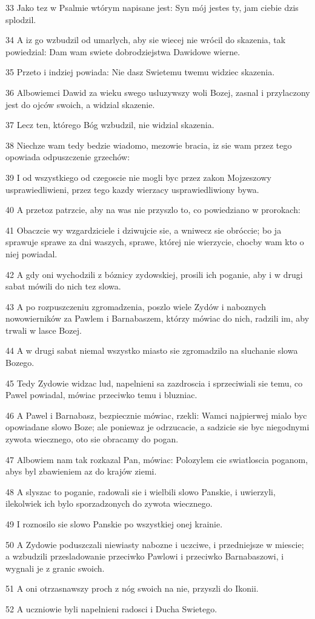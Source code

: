\par 33 Jako tez w Psalmie wtórym napisane jest: Syn mój jestes ty, jam ciebie dzis splodzil.
\par 34 A iz go wzbudzil od umarlych, aby sie wiecej nie wrócil do skazenia, tak powiedzial: Dam wam swiete dobrodziejstwa Dawidowe wierne.
\par 35 Przeto i indziej powiada: Nie dasz Swietemu twemu widziec skazenia.
\par 36 Albowiemci Dawid za wieku swego usluzywszy woli Bozej, zasnal i przylaczony jest do ojców swoich, a widzial skazenie.
\par 37 Lecz ten, którego Bóg wzbudzil, nie widzial skazenia.
\par 38 Niechze wam tedy bedzie wiadomo, mezowie bracia, iz sie wam przez tego opowiada odpuszczenie grzechów:
\par 39 I od wszystkiego od czegoscie nie mogli byc przez zakon Mojzeszowy usprawiedliwieni, przez tego kazdy wierzacy usprawiedliwiony bywa.
\par 40 A przetoz patrzcie, aby na was nie przyszlo to, co powiedziano w prorokach:
\par 41 Obaczcie wy wzgardziciele i dziwujcie sie, a wniwecz sie obróccie; bo ja sprawuje sprawe za dni waszych, sprawe, której nie wierzycie, chocby wam kto o niej powiadal.
\par 42 A gdy oni wychodzili z bóznicy zydowskiej, prosili ich poganie, aby i w drugi sabat mówili do nich tez slowa.
\par 43 A po rozpuszczeniu zgromadzenia, poszlo wiele Zydów i naboznych nowowierników za Pawlem i Barnabaszem, którzy mówiac do nich, radzili im, aby trwali w lasce Bozej.
\par 44 A w drugi sabat niemal wszystko miasto sie zgromadzilo na sluchanie slowa Bozego.
\par 45 Tedy Zydowie widzac lud, napelnieni sa zazdroscia i sprzeciwiali sie temu, co Pawel powiadal, mówiac przeciwko temu i bluzniac.
\par 46 A Pawel i Barnabasz, bezpiecznie mówiac, rzekli: Wamci najpierwej mialo byc opowiadane slowo Boze; ale poniewaz je odrzucacie, a sadzicie sie byc niegodnymi zywota wiecznego, oto sie obracamy do pogan.
\par 47 Albowiem nam tak rozkazal Pan, mówiac: Polozylem cie swiatloscia poganom, abys byl zbawieniem az do krajów ziemi.
\par 48 A slyszac to poganie, radowali sie i wielbili slowo Panskie, i uwierzyli, ilekolwiek ich bylo sporzadzonych do zywota wiecznego.
\par 49 I roznosilo sie slowo Panskie po wszystkiej onej krainie.
\par 50 A Zydowie poduszczali niewiasty nabozne i uczciwe, i przedniejsze w miescie; a wzbudzili przesladowanie przeciwko Pawlowi i przeciwko Barnabaszowi, i wygnali je z granic swoich.
\par 51 A oni otrzasnawszy proch z nóg swoich na nie, przyszli do Ikonii.
\par 52 A uczniowie byli napelnieni radosci i Ducha Swietego.

